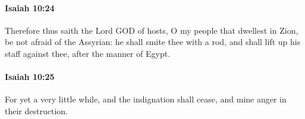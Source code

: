 		\paragraph{Isaiah 10:24} %
			\label{ISAIAH-10-24}

			Therefore thus saith the Lord GOD of hosts, O my people that dwellest in Zion, be not afraid of the Assyrian: he shall smite thee with a rod, and shall lift up his staff against thee, after the manner of Egypt.


		\paragraph{Isaiah 10:25} %
			\label{ISAIAH-10-25}

			For yet a very little while, and the indignation shall cease, and mine anger in their destruction.


